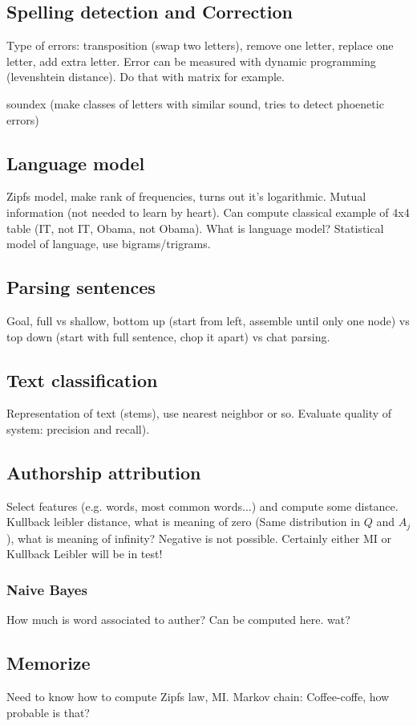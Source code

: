 \documentclass[11pt]{article}
\begin{document}
\subsection{Spelling detection and Correction}
Type of errors: transposition (swap two letters), remove one letter, replace one letter, add extra letter. Error can be measured with dynamic programming (levenshtein distance). Do that
with matrix for example. 

soundex (make classes of letters with similar sound, tries to detect phoenetic
errors)

\subsection{Language model}
Zipfs model, make rank of frequencies, turns out it's logarithmic. 
Mutual information (not needed to learn by heart). Can compute classical example of 4x4 table
(IT, not IT, Obama, not Obama).
What is language model? Statistical model of language, use bigrams/trigrams. 

\subsection{Parsing sentences}
Goal, full vs shallow, bottom up (start from left, assemble until only one node) vs top down (start with full sentence, chop it apart) vs chat parsing. 

\subsection{Text classification}
Representation of text (stems), use nearest neighbor or so. Evaluate quality of system: precision and recall). 

\subsection{Authorship attribution}
Select features (e.g. words, most common words...) and compute some distance. Kullback leibler 
distance, what is meaning of zero (Same distribution in $Q$ and $A_j$), what is meaning of infinity? Negative is not possible. Certainly either MI or Kullback Leibler will be in test!

\subsubsection{Naive Bayes}
How much is word associated to auther? Can be computed here. wat?

\subsection{Memorize}
Need to know how to compute Zipfs law, MI. Markov chain: Coffee-coffe, how probable is that?
\end{document}

